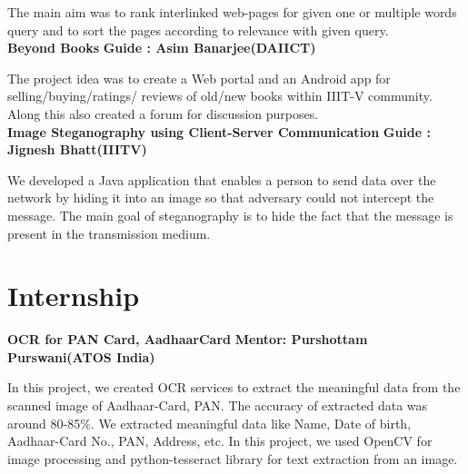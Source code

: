 \documentclass{article}
\begin{document}
\vspace*{.031mm}
\hspace*{2.6mm}The main aim was to rank interlinked web-pages for given one or multiple words query and to sort the pages according to relevance with given query.\\

\vspace*{2mm}
\textbf{\large{Beyond Books}} \hspace*{9.5cm} \textbf{Guide : Asim Banarjee(DAIICT)}

\vspace*{.031mm}
\hspace*{2.6mm} The project idea was to create a Web portal and an Android app for selling/buying/ratings/ reviews of old/new books within IIIT-V community. Along this also created a forum for discussion purposes.\\

\vspace*{2mm}
\textbf{\large{Image Steganography using Client-Server Communication}} \hspace*{1.5cm} \textbf{Guide : Jignesh Bhatt(IIITV)}

\vspace*{.031mm}
\hspace*{2.6mm} We developed a Java application that enables a person to send data over the network by hiding it into an image so that adversary could not intercept the message. The main goal of steganography is to hide the fact that the message is present in the transmission medium.


\newpage
\section{Internship}
\vspace*{2mm}
\textbf{\large{OCR for PAN Card, AadhaarCard}} \hspace*{3cm} \textbf{Mentor: Purshottam Purswani(ATOS India)}

\vspace*{.051mm}
\hspace*{2.6mm} In this project, we created OCR services to extract the meaningful data from the scanned image of Aadhaar-Card, PAN. The accuracy of extracted data was around 80-85\%. We extracted meaningful data like Name, Date of birth, Aadhaar-Card No., PAN, Address, etc. In this project, we used OpenCV for image processing and python-tesseract library for text extraction from an image.\\
\end{document}
